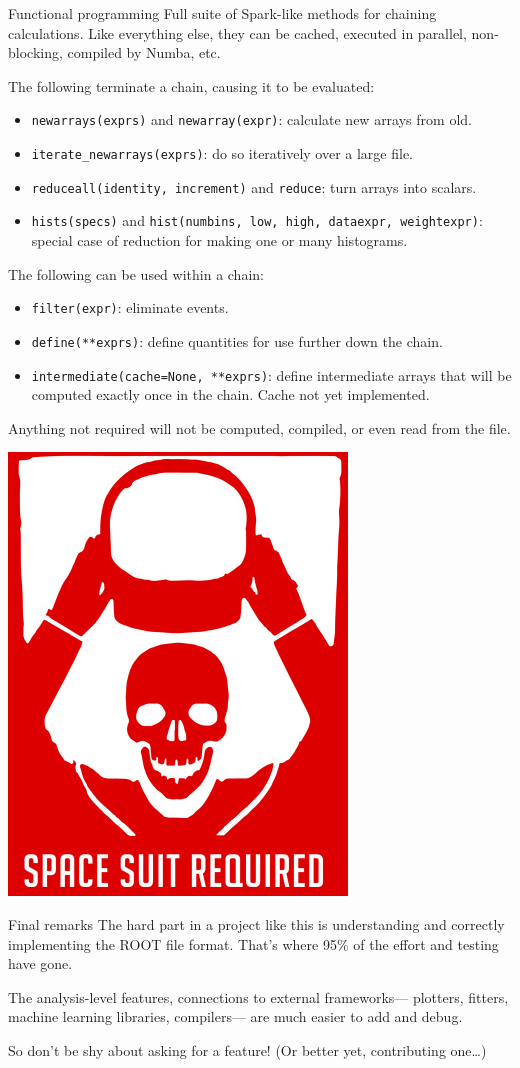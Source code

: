 \documentclass[aspectratio=169]{beamer}
\begin{document}
\begin{frame}{Functional programming}
\vspace{0.35 cm}
Full suite of Spark-like methods for chaining calculations. Like everything else, they can be cached, executed in parallel, non-blocking, compiled by Numba, etc.

\vspace{0.25 cm}
The following terminate a chain, causing it to be evaluated:
\begin{itemize}
\item {\tt\small newarrays(exprs)} and {\tt\small newarray(expr)}: calculate new arrays from old.
\item {\tt\small iterate\_newarrays(exprs)}: do so iteratively over a large file.
\item {\tt\small reduceall(identity, increment)} and {\tt\small reduce}: turn arrays into scalars.
\item {\tt\small hists(specs)} and {\tt\small hist(numbins, low, high, dataexpr, weightexpr)}: special case of reduction for making one or many histograms.
\end{itemize}

\vspace{0.25 cm}
The following can be used within a chain:
\begin{itemize}
\item {\tt\small filter(expr)}: eliminate events.
\item {\tt\small define(**exprs)}: define quantities for use further down the chain.
\item {\tt\small intermediate(cache=None, **exprs)}: define intermediate arrays that will be computed exactly once in the chain. Cache not yet implemented.
\end{itemize}

\vspace{0.25 cm}
Anything not required will not be computed, compiled, or even read from the file.

\vspace{-6.9 cm}
\hfill \includegraphics[width=1.5 cm]{danger.png}\hspace{-0.9 cm}
\vspace{6.9 cm}
\end{frame}

\begin{frame}{Final remarks}
\vspace{0.5 cm}
\large
The hard part in a project like this is understanding and correctly implementing the ROOT file format. That's where 95\% of the effort and testing have gone.

\vspace{1 cm}
The analysis-level features, connections to external frameworks--- plotters, fitters, machine learning libraries, compilers--- are much easier to add and debug.

\vspace{1 cm}
So don't be shy about asking for a feature! (Or better yet, contributing one\ldots)
\end{frame}
\end{document}
